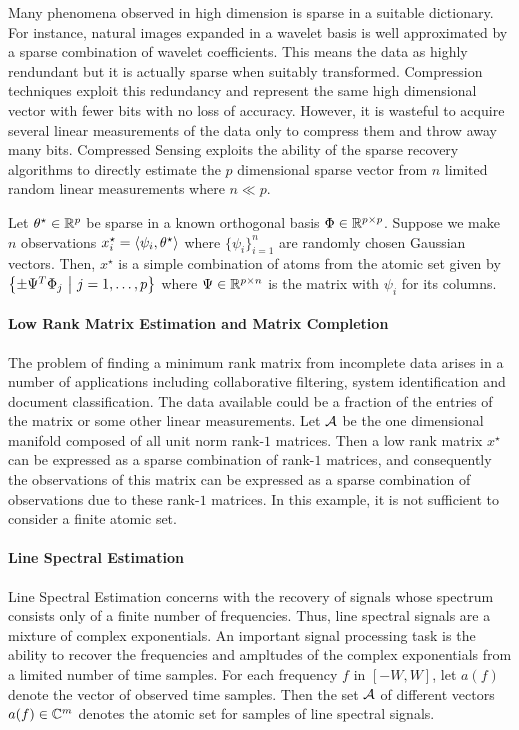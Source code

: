 Many phenomena observed in high dimension is sparse in a suitable dictionary.
For instance, natural images expanded in a wavelet basis is well approximated by
a sparse combination of wavelet coefficients. This means the data as highly
rendundant but it is actually sparse when suitably transformed. Compression
techniques exploit this redundancy and represent the same high dimensional
vector with fewer bits with no loss of accuracy. However, it is wasteful to
acquire several linear measurements of the data only to compress them and throw
away many bits. Compressed Sensing exploits the ability of the sparse recovery
algorithms to directly estimate the $p$ dimensional sparse vector from $n$
limited random linear measurements where $n \ll p$.

Let $\theta^\star \in \mathbb{R}^p$ be sparse in a known orthogonal basis $\Phi \in
\mathbb{R}^{p \times p}$. Suppose we make $n$ observations $x^\star_i =
\langle\psi_i, \theta^\star\rangle$ where $\{\psi_i\}_{i=1}^n$ are randomly chosen
Gaussian vectors. Then, $x^\star$ is a simple combination of atoms from the
atomic set given by $\left\{ \pm \Psi^T \Phi_j ~\middle|~ j=1,\ldots,p \right\}$ where $\Psi \in
\mathbb{R}^{p \times n}$ is the matrix with $\psi_i$ for its columns.


\paragraph{Low Rank Matrix Estimation and Matrix Completion}

The problem of finding a minimum rank matrix from incomplete data arises in a
number of applications including collaborative filtering, system identification
and document classification. The data available could be a fraction of the
entries of the matrix or some other linear measurements. Let $\mathcal{A}$ be the one
dimensional manifold composed of all unit norm rank-$1$ matrices. Then a low
rank matrix $x^\star$ can be expressed as a sparse combination of rank-$1$
matrices, and consequently the observations of this matrix can be expressed as a sparse combination of observations due to these rank-$1$ matrices. In this example, it is not sufficient to consider a finite atomic set.

\paragraph{Line Spectral Estimation} Line Spectral Estimation concerns with
the recovery of signals whose spectrum consists only of a finite number of
frequencies. Thus, line spectral signals are a mixture of complex
exponentials. An important signal processing task is the ability to recover
the frequencies and ampltudes of the complex exponentials from a limited
number of time samples. For each frequency $f$ in $[-W,W]$, let $a(f)$ denote
the vector of observed time samples. Then the set $\mathcal{A}$ of different vectors
$a(f) \in \mathbb{C}^m$ denotes the atomic set for samples of line spectral signals.

